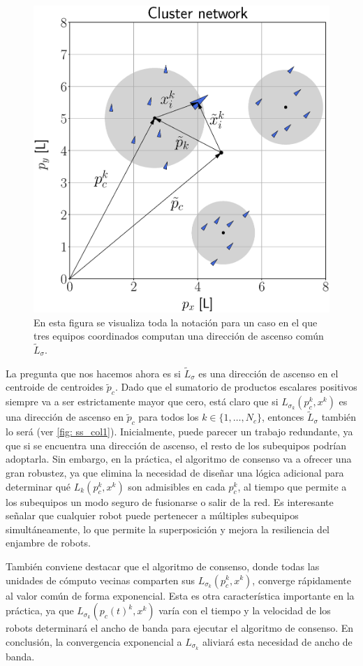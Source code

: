\begin{figure}[!h]
    \centering
    \includegraphics[trim={0 0 0 3.34cm}, clip, width=0.6\columnwidth]{./fig/pctilde.eps}
    \caption{En esta figura se visualiza toda la notación para un caso en el que tres equipos coordinados computan una dirección de ascenso común $\tilde L_\sigma$.}
    \label{fig: pctilde}
\end{figure}

La pregunta que nos hacemos ahora es si $\tilde L_\sigma$ es una dirección de ascenso en el centroide de centroides $\tilde p_c$. Dado que el sumatorio de productos escalares positivos siempre va a ser estrictamente mayor que cero, está claro que si $L_{\sigma_k}(p_c^k, x^k)$ es una dirección de ascenso en $\tilde p_c$ para todos los $k \in \{1,\dots,N_c\}$, entonces $\tilde L_\sigma$ también lo será (ver \autoref{fig: ss_col1}). Inicialmente, puede parecer un trabajo redundante, ya que si se encuentra una dirección de ascenso, el resto de los subequipos podrían adoptarla. Sin embargo, en la práctica, el algoritmo de consenso va a ofrecer una gran robustez, ya que elimina la necesidad de diseñar una lógica adicional para determinar qué $L_k(p_c^k, x^k)$ son admisibles en cada $p_c^k$, al tiempo que permite a los subequipos un modo seguro de fusionarse o salir de la red. Es interesante señalar que cualquier robot puede pertenecer a múltiples subequipos simultáneamente, lo que permite la superposición y mejora la resiliencia del enjambre de robots.

También conviene destacar que el algoritmo de consenso, donde todas las unidades de cómputo vecinas comparten sus $L_{\sigma_k}(p_c^k, x^k)$, converge rápidamente al valor común de forma exponencial. Esta es otra característica importante en la práctica, ya que $L_{\sigma_k}(p_c(t)^k, x^k)$ varía con el tiempo y la velocidad de los robots determinará el ancho de banda para ejecutar el algoritmo de consenso. En conclusión, la convergencia exponencial a $L_{\sigma_k}$ aliviará esta necesidad de ancho de banda. 

